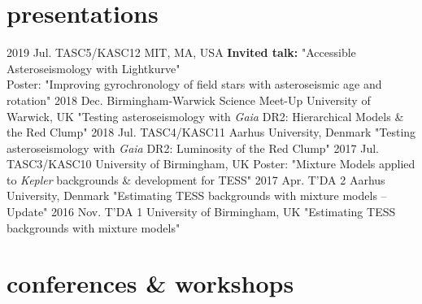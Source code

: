 \documentclass[]{k-cv} %
\begin{document}
\section{presentations}

\begin{entrylist}
\entry
{2019 Jul.}
{TASC5/KASC12}
{MIT, MA, USA}
{\textbf{Invited talk:} "Accessible Asteroseismology with Lightkurve"\\ \small{Poster: "Improving gyrochronology of field stars with asteroseismic age and rotation"}}
\entry
{2018 Dec.}
{Birmingham-Warwick Science Meet-Up}
{University of Warwick, UK}
{"Testing asteroseismology with \textit{Gaia} DR2: Hierarchical Models \& the Red Clump"}
\entry
{2018 Jul.}
{TASC4/KASC11}
{Aarhus University, Denmark}
{"Testing asteroseismology with \textit{Gaia} DR2: Luminosity of the Red Clump"}
\entry
{2017 Jul.}
{TASC3/KASC10}
{University of Birmingham, UK}
{\small{Poster: "Mixture Models applied to \emph{Kepler} backgrounds \& development for TESS"}}
\entry
{2017 Apr.}
{T'DA 2}
{Aarhus University, Denmark}
{"Estimating TESS backgrounds with mixture models -- Update"}
\entry
{2016 Nov.}
{T'DA 1}
{University of Birmingham, UK}
{"Estimating TESS backgrounds with mixture models"}
\end{entrylist}

\section{conferences \& workshops}
\end{document}
